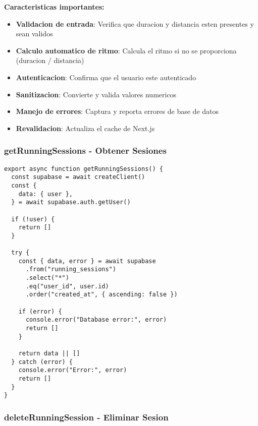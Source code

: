 \documentclass[12pt,a4paper]{article}
\begin{document}
\textbf{Caracteristicas importantes:}
\begin{itemize}
    \item \textbf{Validacion de entrada}: Verifica que duracion y distancia esten presentes y sean validos
    \item \textbf{Calculo automatico de ritmo}: Calcula el ritmo si no se proporciona (duracion / distancia)
    \item \textbf{Autenticacion}: Confirma que el usuario este autenticado
    \item \textbf{Sanitizacion}: Convierte y valida valores numericos
    \item \textbf{Manejo de errores}: Captura y reporta errores de base de datos
    \item \textbf{Revalidacion}: Actualiza el cache de Next.js
\end{itemize}

\subsubsection{getRunningSessions - Obtener Sesiones}

\begin{lstlisting}[caption=Funcion getRunningSessions completa]
export async function getRunningSessions() {
  const supabase = await createClient()
  const {
    data: { user },
  } = await supabase.auth.getUser()

  if (!user) {
    return []
  }

  try {
    const { data, error } = await supabase
      .from("running_sessions")
      .select("*")
      .eq("user_id", user.id)
      .order("created_at", { ascending: false })

    if (error) {
      console.error("Database error:", error)
      return []
    }

    return data || []
  } catch (error) {
    console.error("Error:", error)
    return []
  }
}
\end{lstlisting}

\subsubsection{deleteRunningSession - Eliminar Sesion}
\end{document}
